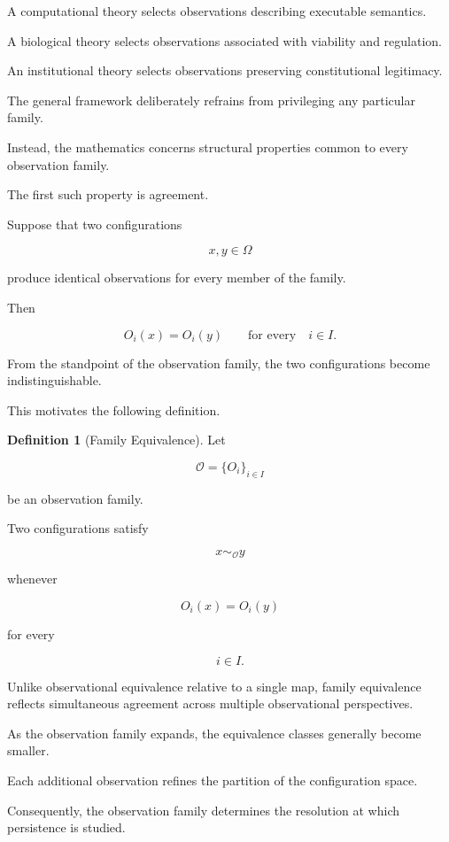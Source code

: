 \documentclass[11pt]{book}
\numberwithin{equation}{chapter}
\theoremstyle{definition}
\newtheorem{definition}{Definition}[chapter]
\theoremstyle{plain}
\begin{document}
A computational theory selects observations describing executable semantics.

A biological theory selects observations associated with viability and regulation.

An institutional theory selects observations preserving constitutional legitimacy.

The general framework deliberately refrains from privileging any particular family.

Instead, the mathematics concerns structural properties common to every observation family.

The first such property is agreement.

Suppose that two configurations

\[
x,y\in\Omega
\]

produce identical observations for every member of the family.

Then

\[
O_i(x)=O_i(y)
\qquad
\text{for every}
\quad
i\in I.
\]

From the standpoint of the observation family, the two configurations become indistinguishable.

This motivates the following definition.

\begin{definition}[Family Equivalence]

Let

\[
\mathcal{O}
=
\{O_i\}_{i\in I}
\]

be an observation family.

Two configurations satisfy

\[
x\sim_{\mathcal O}y
\]

whenever

\[
O_i(x)=O_i(y)
\]

for every

\[
i\in I.
\]

\end{definition}

Unlike observational equivalence relative to a single map, family equivalence reflects simultaneous agreement across multiple observational perspectives.

As the observation family expands, the equivalence classes generally become smaller.

Each additional observation refines the partition of the configuration space.

Consequently, the observation family determines the resolution at which persistence is studied.
\end{document}
